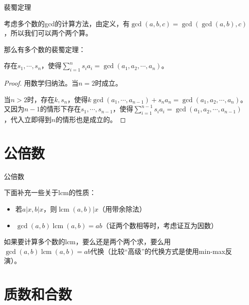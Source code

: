 \documentclass{ctexbeamer}        %
\newcommand{\lcm}{\operatorname{lcm}}
\begin{document}
\begin{frame}{裴蜀定理}

考虑多个数的gcd的计算方法，由定义，有$\gcd(a,b,c)=\gcd(\gcd(a,b),c)$，所以我们可以两个两个算。

那么有多个数的裴蜀定理：

\begin{theorem}[裴蜀定理]
    存在$s_1,\cdots,s_n$，使得$\sum_{i=1}^n s_ia_i=\gcd(a_1,a_2,\cdots,a_n)$。
\end{theorem}

\begin{proof}
    用数学归纳法。当$n=2$时成立。

    当$n>2$时，存在$k,s_n$，使得$k\gcd(a_1,\cdots,a_{n-1})+s_na_n=\gcd(a_1,a_2,\cdots,a_n)$。又因为$n-1$的情形下存在$s_1,\cdots,s_{n-1}$，使得$\sum_{i=1}^{n-1} s_ia_i=\gcd(a_1,a_2,\cdots,a_{n-1})$，代入立即得到$n$的情形也是成立的。
\end{proof}

\end{frame}

\section{公倍数}

\begin{frame}{公倍数}

下面补充一些关于lcm的性质：

\begin{itemize}
    \item 若$a|x,b|x$，则$\lcm(a,b)|x$（用带余除法）
    \item $\gcd(a,b)\lcm(a,b)=ab$（证两个数相等时，考虑证互为因数）
\end{itemize}

如果要计算多个数的lcm，要么还是两个两个求，要么用$\gcd(a,b)\lcm(a,b)=ab$代换（比较``高级''的代换方式是使用min-max反演）。

\end{frame}

\section{质数和合数}
\end{document}
